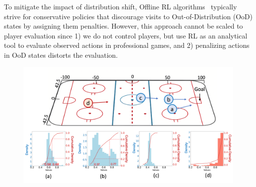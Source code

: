 \documentclass{article}
\begin{document}
To mitigate the impact of distribution shift, Offline RL algorithms~\cite{Levine2020OfflineRL} typically strive for conservative policies that discourage visits to Out-of-Distribution (OoD) states by assigning them penalties. However, this approach cannot be scaled to player evaluation since 1) we do not control players, but use RL as an analytical tool to evaluate observed actions in professional games, and 2) penalizing actions in OoD states distorts the evaluation.


\begin{figure}
    \centering
    \includegraphics[scale=0.15]{figures/ice-hockey-rink-marked.png}

\end{figure}
\end{document}
